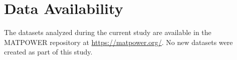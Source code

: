 \section*{Data Availability}

The datasets analyzed during the current study are available in the MATPOWER repository \cite{matpower} at \href{https://matpower.org/}{https://matpower.org/}.
No new datasets were created as part of this study.
